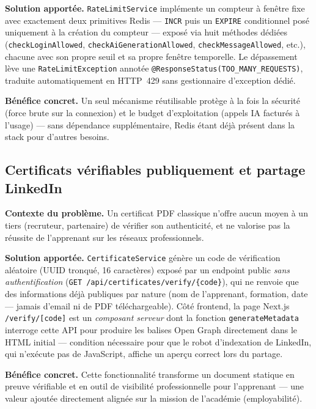 \textbf{Solution apportée.} \texttt{RateLimitService} implémente un
compteur à fenêtre fixe avec exactement deux primitives Redis --- \texttt{INCR}
puis un \texttt{EXPIRE} conditionnel posé uniquement à la création du
compteur --- exposé via huit méthodes dédiées
(\texttt{checkLoginAllowed}, \texttt{checkAiGenerationAllowed},
\texttt{checkMessageAllowed}, etc.), chacune avec son propre seuil et sa
propre fenêtre temporelle. Le dépassement lève une
\texttt{RateLimitException} annotée \texttt{@ResponseStatus(TOO\_MANY\_REQUESTS)},
traduite automatiquement en HTTP~429 sans gestionnaire d'exception dédié.

\textbf{Bénéfice concret.} Un seul mécanisme réutilisable protège à la
fois la sécurité (force brute sur la connexion) et le budget
d'exploitation (appels IA facturés à l'usage) --- sans dépendance
supplémentaire, Redis étant déjà présent dans la stack pour d'autres
besoins.

\subsection{Certificats vérifiables publiquement et partage LinkedIn}
\label{sec:certificat-linkedin}

\textbf{Contexte du problème.} Un certificat PDF classique n'offre aucun
moyen à un tiers (recruteur, partenaire) de vérifier son authenticité, et
ne valorise pas la réussite de l'apprenant sur les réseaux professionnels.

\textbf{Solution apportée.} \texttt{CertificateService} génère un code de
vérification aléatoire (UUID tronqué, 16 caractères) exposé par un
endpoint public \emph{sans authentification}
(\texttt{GET /api/certificates/verify/\{code\}}), qui ne renvoie que des
informations déjà publiques par nature (nom de l'apprenant, formation,
date --- jamais d'email ni de PDF téléchargeable). Côté frontend, la page
Next.js \texttt{/verify/[code]} est un \emph{composant serveur} dont la
fonction \texttt{generateMetadata} interroge cette API pour produire les
balises Open Graph directement dans le HTML initial --- condition
nécessaire pour que le robot d'indexation de LinkedIn, qui n'exécute pas
de JavaScript, affiche un aperçu correct lors du partage.

\textbf{Bénéfice concret.} Cette fonctionnalité transforme un document
statique en preuve vérifiable et en outil de visibilité professionnelle
pour l'apprenant --- une valeur ajoutée directement alignée sur la mission
de l'académie (employabilité).

